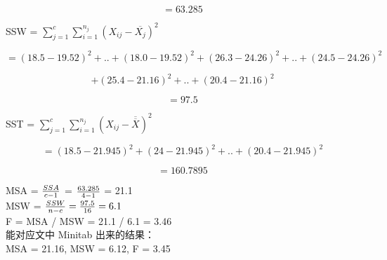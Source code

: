 \[= 63.285\]

SSW = \(\sum_{j=1}^c \sum_{i=1}^{n_j} (X_{ij} - \overline{X_j})^2\)

\[=(18.5 - 19.52)^2 + . . + (18.0 - 19.52)^2 + (26.3 - 24.26)^2 + . . + (24.5 - 24.26)^2\]

\[+(25.4 - 21.16)^2 + . . + (20.4 - 21.16)^2\]

\[= 97.5\]

SST =
\(\sum_{j=1}^c \sum_{i=1}^{n_j} (X_{ij} - \overline{\overline{X}})^2\)

\[= (18.5 - 21.945)^2 + (24 - 21.945)^2 + ..+ (20.4 - 21.945)^2\]

\[= 160.7895\]

MSA = \({SSA \over c-1}\) = \({63.285 \over 4-1}\) = 21.1\\
MSW = \({SSW \over n -c} = {97.5 \over 16}= 6.1\)\\
F = MSA / MSW = 21.1 / 6.1 = 3.46\\
能对应文中 Minitab 出来的结果：\\
MSA = 21.16, MSW = 6.12, F = 3.45\\


